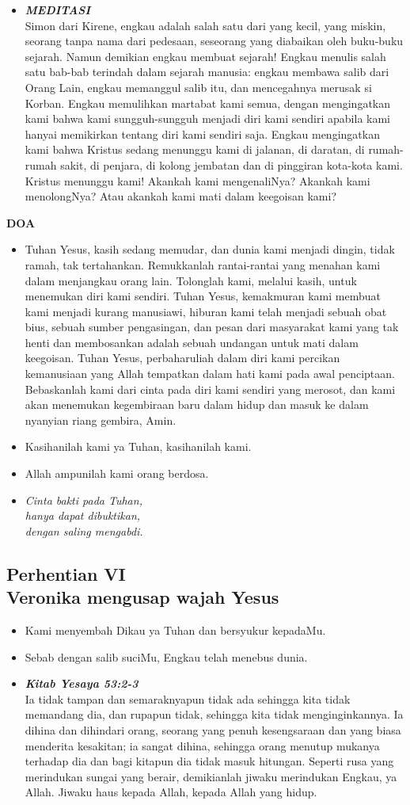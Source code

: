 \documentclass[a5paper,titlepage,11pt,openany]{scrbook}
\newcommand{\BU}[1]{\begin{itemize} \item[U:] #1 \end{itemize}}
\newcommand{\BP}[1]{\begin{itemize} \item[P:] #1 \end{itemize}}
\newcommand{\kamiMenyembah}{\BP{ Kami menyembah Dikau ya Tuhan dan bersyukur kepadaMu.}
\BU{Sebab dengan salib suciMu, Engkau telah menebus dunia.}
}
\newcommand{\kasihanilahKami}{\BP{Kasihanilah kami ya Tuhan, kasihanilah kami.}
\BU{Allah ampunilah kami orang berdosa.}}
\newcommand{\BPi}[2]
{\begin{itemize} \item[P1:] \textbf{\emph{#1}}\\#2 \end{itemize}}
\newcommand{\BPii}[1]
{\begin{itemize} \item[P2:] \textbf{\emph{MEDITASI}}\\#1 \end{itemize}}
\newcommand{\lagu}[2]{%
\begin{itemize}
\item[#1.] \it{#2}
\end{itemize}}
\newcommand{\henti}[2]{%
\subsection*{Perhentian #1\\#2 } 
\kamiMenyembah
}
\begin{document}
\BPii{
	Simon dari Kirene, engkau adalah salah satu dari yang kecil, yang miskin, seorang tanpa nama dari pedesaan, seseorang yang diabaikan oleh buku-buku sejarah. Namun demikian engkau membuat sejarah! Engkau menulis salah satu bab-bab terindah dalam sejarah manusia: engkau membawa salib dari Orang Lain, engkau memanggul salib itu, dan mencegahnya merusak si Korban. Engkau memulihkan martabat kami semua, dengan mengingatkan kami bahwa kami sungguh-sungguh menjadi diri kami sendiri apabila kami hanyai memikirkan tentang diri kami sendiri saja.  Engkau mengingatkan kami bahwa Kristus sedang menunggu kami di jalanan, di daratan, di rumah-rumah sakit, di penjara, di kolong jembatan dan di pinggiran kota-kota kami. Kristus menunggu kami!  Akankah kami mengenaliNya? Akankah kami menolongNya? Atau akankah kami mati dalam keegoisan kami? }

\textbf{DOA}

\BU{Tuhan Yesus, kasih sedang memudar, dan dunia kami menjadi dingin, tidak ramah, tak tertahankan. Remukkanlah rantai-rantai yang menahan kami dalam menjangkau orang lain. Tolonglah kami, melalui kasih, untuk menemukan diri kami sendiri. Tuhan Yesus, kemakmuran kami membuat kami menjadi kurang manusiawi, hiburan kami telah menjadi sebuah obat bius, sebuah sumber pengasingan, dan pesan dari masyarakat kami yang tak henti dan membosankan adalah sebuah undangan untuk mati dalam keegoisan. Tuhan Yesus, perbaharuliah dalam diri kami percikan kemanusiaan yang Allah tempatkan dalam hati kami pada awal penciptaan. Bebaskanlah kami dari cinta pada diri kami sendiri yang merosot, dan kami akan menemukan kegembiraan baru dalam hidup dan masuk ke dalam nyanyian riang gembira, Amin.}

\kasihanilahKami

\lagu{6}{Cinta bakti pada Tuhan,\\
hanya dapat dibuktikan,\\
dengan saling mengabdi.}

\henti{VI}{Veronika mengusap wajah Yesus}

\BPi{Kitab Yesaya 53:2-3 }{%
Ia tidak tampan dan semaraknyapun tidak ada sehingga kita tidak memandang dia, dan rupapun tidak, sehingga kita tidak menginginkannya. Ia dihina dan dihindari orang, seorang yang penuh kesengsaraan dan yang biasa menderita kesakitan; ia sangat dihina, sehingga orang menutup mukanya terhadap dia dan bagi kitapun dia tidak masuk hitungan. Seperti rusa yang merindukan sungai yang berair, demikianlah jiwaku merindukan Engkau, ya Allah. Jiwaku haus kepada Allah, kepada Allah yang hidup.}
\end{document}
